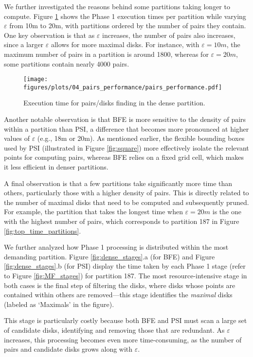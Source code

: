 We further investigated the reasons behind some partitions taking longer to compute. Figure \ref{fig:pairs_performance} shows the Phase 1 execution times per partition while varying $\varepsilon$ from 10m to 20m, with partitions ordered by the number of pairs they contain. One key observation is that as $\varepsilon$ increases, the number of pairs also increases, since a larger $\varepsilon$ allows for more maximal disks. For instance, with $\varepsilon = 10m$, the maximum number of pairs in a partition is around 1800, whereas for $\varepsilon = 20m$, some partitions contain nearly 4000 pairs.

\begin{figure}
    \centering
    \texttt{[image: figures/plots/04\_pairs\_performance/pairs\_performance.pdf]}
    \caption{Execution time for pairs/disks finding in the dense partition.}
    \label{fig:pairs_performance}
\end{figure}

Another notable observation is that BFE is more sensitive to the density of pairs within a partition than PSI, a difference that becomes more pronounced at higher values of $\varepsilon$ (e.g., 18m or 20m). As mentioned earlier, the flexible bounding boxes used by PSI (illustrated in Figure \ref{fig:square}) more effectively isolate the relevant points for computing pairs, whereas BFE relies on a fixed grid cell, which makes it less efficient in denser partitions.

A final observation is that a few partitions take significantly more time than others, particularly those with a higher density of pairs. This is directly related to the number of maximal disks that need to be computed and subsequently pruned. For example, the partition that takes the longest time when $\varepsilon = 20m$ is the one with the highest number of pairs, which corresponds to partition 187 in Figure \ref{fig:top_time_partitions}.

We further analyzed how Phase 1 processing is distributed within the most demanding partition. Figure \ref{fig:dense_stages}.a (for BFE) and Figure \ref{fig:dense_stages}.b (for PSI) display the time taken by each Phase 1 stage (refer to Figure \ref{fig:MF_stages}) for partition 187. The most resource-intensive stage in both cases is the final step of filtering the disks, where disks whose points are contained within others are removed—this stage identifies the \textit{maximal} disks (labeled as `Maximals' in the figure).

This stage is particularly costly because both BFE and PSI must scan a large set of candidate disks, identifying and removing those that are redundant. As $\varepsilon$ increases, this processing becomes even more time-consuming, as the number of pairs and candidate disks grows along with $\varepsilon$.

